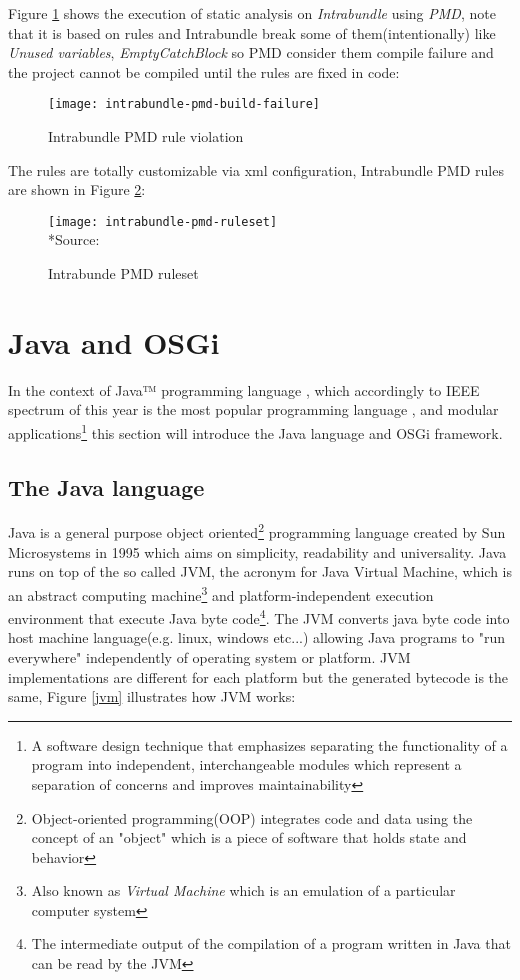 \FloatBarrier

Figure \ref{pmd_violation} shows the execution of static analysis on \textit{Intrabundle} using \emph{PMD}, note that it is based on rules and Intrabundle break some of them(intentionally) like \emph{Unused variables}, \emph{EmptyCatchBlock} so PMD consider them compile failure and the project cannot be compiled until the rules are fixed in code:

\begin{figure}[h]
\caption{Intrabundle PMD rule violation}
\label{pmd_violation}
\centering
\texttt{[image: intrabundle-pmd-build-failure]}
\end{figure}

\FloatBarrier

The rules are totally customizable via xml configuration, Intrabundle PMD rules are shown in Figure \ref{pmd_ruleset}:

\begin{figure}[h]
\caption{Intrabunde PMD ruleset}
\label{pmd_ruleset}
\centering
\texttt{[image: intrabundle-pmd-ruleset]}
\\*Source: \cite{intrabundle pmd 2014}
\end{figure}

\FloatBarrier

\section{Java and OSGi}

In the context of Java™ programming language \citep{Arnold 2005}, which accordingly to IEEE spectrum of this year is the most popular programming language \citep{ieee spectrum 2014}, and modular applications\footnote{A software design technique that emphasizes separating the functionality of a program into independent, interchangeable modules which represent a separation of concerns and improves maintainability} this section will introduce the Java language and OSGi framework.

\subsection{The Java language}
Java is a general purpose object oriented\footnote{Object-oriented programming(OOP) integrates code and data using the concept of an "object" which is a piece of software that holds state and behavior} programming language created by Sun Microsystems in 1995 which aims on simplicity, readability and universality. Java runs on top of the so called JVM, the acronym for Java Virtual Machine, which is an abstract computing machine\footnote{Also known as \textit{Virtual Machine} which is an emulation of a particular computer system} and platform-independent execution environment that execute Java byte code\footnote{The intermediate output of the compilation of a program written in Java that can be read by the JVM}. The JVM converts java byte code into host machine language(e.g. linux, windows etc...) allowing Java programs to "run everywhere" independently of operating system or platform. JVM implementations are different for each platform but the generated bytecode is the same, Figure \ref{jvm} illustrates how JVM works:

